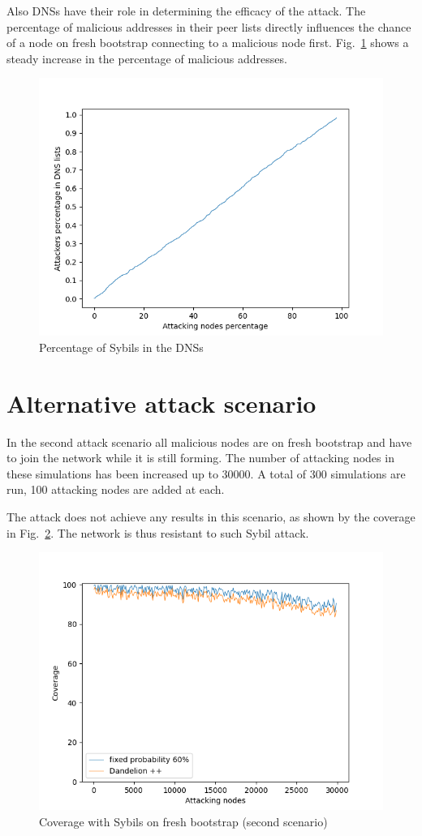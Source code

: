 Also DNSs have their role in determining the efficacy of the attack. The percentage of malicious addresses in their peer lists directly influences the chance of a node on fresh bootstrap connecting to a malicious node first. Fig.~\ref{fig:dns} shows a steady increase in the percentage of malicious addresses.

\begin{figure}[h!]
	\includegraphics[width=.8\textwidth]{pict/results/in-dns.png}
	\centering
	\caption{Percentage of Sybils in the DNSs}
	\label{fig:dns}
\end{figure}

\section{Alternative attack scenario}\label{sec:external}
In the second attack scenario all malicious nodes are on fresh bootstrap and have to join the network while it is still forming. The number of attacking nodes in these simulations has been increased up to 30000. A total of 300 simulations are run, 100 attacking nodes are added at each.\par

The attack does not achieve any results in this scenario, as shown by the coverage in Fig.~\ref{fig:ext-cov}. The network is thus resistant to such Sybil attack.\par

\begin{figure}[h!]
	\includegraphics[width=.8\textwidth]{pict/results/ext-cov.png}
	\centering
	\caption{Coverage with Sybils on fresh bootstrap (second scenario)}
	\label{fig:ext-cov}
\end{figure}

